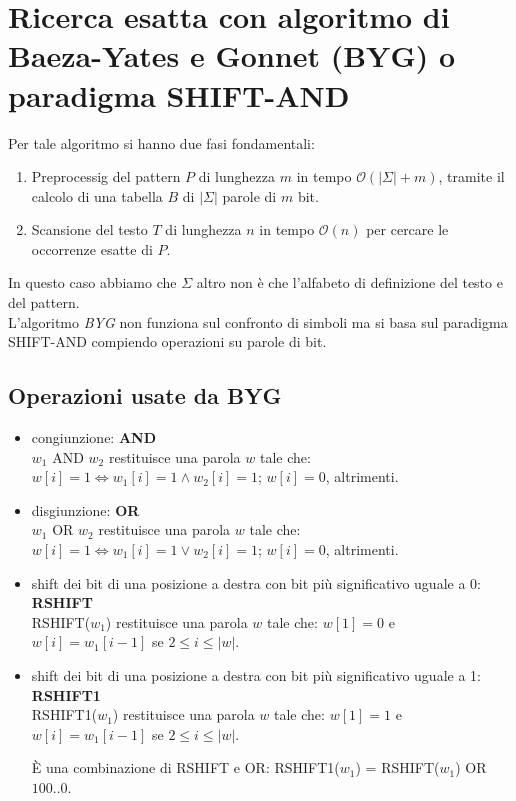\section{Ricerca esatta con algoritmo di Baeza-Yates e Gonnet (BYG) o paradigma SHIFT-AND}
Per tale algoritmo si hanno due fasi fondamentali:
\begin{enumerate}
    \item Preprocessig del pattern $P$ di lunghezza $m$ in tempo $\mathcal{O}(|\Sigma|+m)$, tramite il calcolo di una tabella $B$ di $|\Sigma|$ parole di $m$ bit. 
    \item Scansione del testo $T$ di lunghezza $n$ in tempo $\mathcal{O}(n)$ per cercare le occorrenze esatte di $P$.
\end{enumerate}
In questo caso abbiamo che $\Sigma$ altro non è che l'alfabeto di definizione del testo e del pattern. \\
L'algoritmo \textit{BYG} non funziona sul confronto di simboli ma si basa sul  paradigma SHIFT-AND compiendo operazioni su parole di bit.

\subsection{Operazioni usate da BYG}
\begin{itemize}
    \item  congiunzione: \textbf{AND} \\
    $w_1$ AND $w_2$ restituisce una parola $w$ tale che: $w[i]=1 \iff w_1[i]=1 \land w_2[i]=1$; $w[i] = 0$, altrimenti.
    \item  disgiunzione: \textbf{OR}\\
    $w_1$ OR $w_2$ restituisce una parola $w$ tale che: $w[i]=1 \iff w_1[i]=1 \lor w_2[i]=1$; $w[i] = 0$, altrimenti.
    \item  shift dei bit di una posizione a destra con bit più significativo uguale a 0: \textbf{RSHIFT}\\
    RSHIFT($w_1$) restituisce una parola $w$ tale che: $w[1]=0$ e $w[i] = w_1[i-1]$ se $2 \leq i \leq |w|$.
    \item  shift dei bit di una posizione a destra con bit più significativo uguale a 1: \textbf{RSHIFT1}\\
    RSHIFT1($w_1$) restituisce una parola $w$ tale che: $w[1]=1$ e $w[i] = w_1[i-1]$ se $2 \leq i \leq |w|$.

  È una combinazione di RSHIFT e OR: RSHIFT1($w_1$) = RSHIFT($w_1$) OR $100..0$.
\end{itemize}

